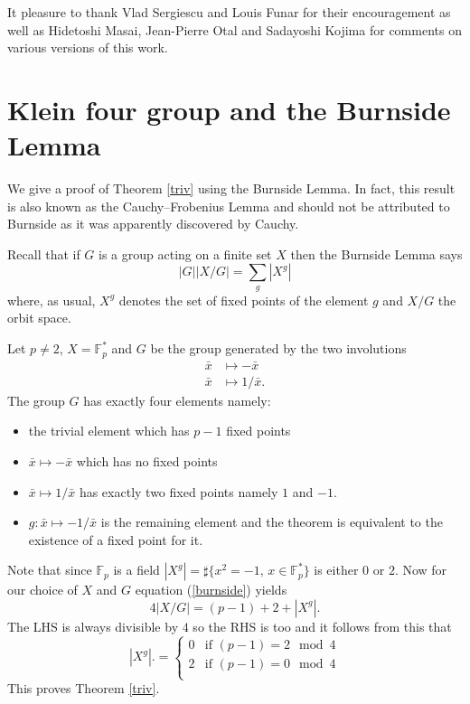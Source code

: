 \documentclass[12pt,a4paper]{amsart}
\def\fp{\mathbb{F}_p}
\begin{document}
It pleasure to thank Vlad Sergiescu and Louis Funar for their
encouragement as well as Hidetoshi Masai, Jean-Pierre Otal and
Sadayoshi Kojima for comments on various versions of this work.


\section{Klein four group and the Burnside Lemma}
\label{burnside for triv}

We give a proof of Theorem \ref{triv} using the Burnside Lemma.
In fact, this result is also known as the Cauchy–Frobenius Lemma and should not be attributed to Burnside as it was
apparently discovered by Cauchy.


Recall that if $G$ is  a group acting on a finite set $X$ then the Burnside Lemma says
\begin{equation}\label{burnside}
|G| |X/G| = \sum_{g} |X^g| 
\end{equation}  
where, as usual, 
 $X^g$ denotes the set of fixed points of the element $g$ 
 and $X/G$  the orbit space.

Let $p\neq 2$,  $X = \fp^*$ and $G$ be the group generated by the two involutions
\begin{eqnarray*}
	\bar{x} & \mapsto -\bar{x} \\
	\bar{x} & \mapsto 1/\bar{x}.
\end{eqnarray*}
The group  $G$ has exactly four elements namely:
\begin{itemize}
\item the trivial element which has  $p-1$ fixed points
\item $\bar{x} \mapsto -\bar{x}$ which has no fixed points 
\item  $\bar{x}\mapsto 1/\bar{x}$ has exactly two fixed points namely $1$ and $-1$.
\item  $g:\bar{x} \mapsto -1/ \bar{x}$ is the remaining element and the theorem is equivalent to the existence of a fixed point for it.
\end{itemize}
Note that since $\fp$ is a field 
$|X^g| = \sharp \{x^2 = -1, \, x\in \fp^* \}$
is either $0$ or $2$.
Now for our choice of $X$ and $G$ equation (\ref{burnside}) yields
\begin{equation}
4 |X/G|   = (p-1) + 2 + |X^g|.
\end{equation}  
The LHS is always divisible by $4$ so the  RHS is too and
it follows from this that
$$ |X^g|. = \left\{  \begin{array}{ll}
		0 & \text{if }(p-1) =  2 \mod 4 \\
2 & \text{if }(p-1) =  0 \mod 4 \\
\end{array}
\right.
$$
This proves Theorem \ref{triv}.
\end{document}
